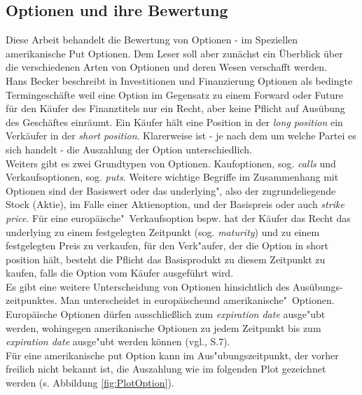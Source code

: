 \documentclass[10pt,a4paper]{article}
\begin{document}
\subsection{Optionen und ihre Bewertung}
Diese Arbeit behandelt die Bewertung von Optionen - im Speziellen amerikanische Put Optionen.
Dem Leser soll aber zunächst ein Überblick über die verschiedenen Arten von Optionen und deren Wesen verschafft werden.\\
Hans Becker beschreibt in \glqq Investitionen und Finanzierung \grqq Optionen als \glqq bedingte Termingeschäfte \grqq \cite[S.313]{Becker2012} weil eine Option im Gegensatz zu einem Forward oder Future für den Käufer des Finanztitels nur ein Recht, aber keine Pflicht auf Ausübung des Geschäftes einräumt. Ein Käufer hält eine Position in der \textit{long position}  ein Verkäufer in der \textit{short position}. Klarerweise ist - je nach dem um welche Partei es sich handelt -  die Auszahlung der Option unterschiedlich.\\
Weiters gibt es zwei Grundtypen von Optionen. Kaufoptionen, sog. \textit{calls} und Verkaufsoptionen, sog. \textit{puts}. Weitere wichtige Begriffe im Zusammenhang mit Optionen sind der Basiswert oder das \glqq underlying", also der zugrundeliegende Stock (Aktie), im Falle einer Aktienoption, und der Basispreis oder auch \textit{strike price}. Für eine \glqq europäische"\ Verkaufsoption bspw. hat der Käufer das Recht das underlying zu 
einem festgelegten Zeitpunkt (sog. \textit{maturity}) und zu einem festgelegten Preis zu verkaufen, für den Verk"aufer, der die Option in short position hält, besteht die Pflicht das Basisprodukt zu diesem Zeitpunkt zu kaufen, falls die Option vom Käufer ausgeführt wird.\\
Es gibt eine weitere Unterscheidung von Optionen hinsichtlich des Ausübungs-zeitpunktes. Man unterscheidet in \glqq europäische\grqq und \glqq amerikanische"\ Optionen. Europäische Optionen dürfen ausschließlich zum \textit{expiration date} ausge"ubt werden, wohingegen amerikanische Optionen zu jedem Zeitpunkt bis zum \textit{expiration date}  ausge"ubt werden können (vgl.\cite{Hull}, S.7).\\
Für eine amerikanische put Option kann im Aus"ubungszeitpunkt, der vorher freilich nicht bekannt ist, die Auszahlung wie im folgenden Plot gezeichnet werden (s. Abbildung \ref{fig:PlotOption}).
\end{document}
